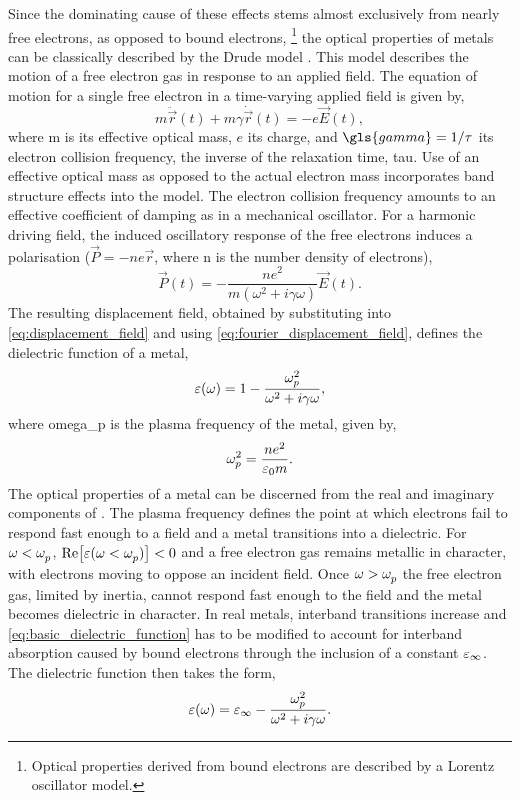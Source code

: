 \documentclass{article}
\begin{document}
Since the dominating cause of these effects stems almost exclusively from nearly free electrons, as opposed to bound electrons,%
\footnote{Optical properties derived from bound electrons are described by a Lorentz oscillator model.}
the optical properties of metals can be classically described by the Drude model \cite{drude1900}. This model describes the motion of a free electron gas in response to an applied field. The equation of motion for a single free electron in a time-varying applied field is given by,
\begin{equation}
	m\ddot{\vec{r}}(t) + m\gamma \dot{\vec{r}}(t) = -e\vec{E}(t),
\end{equation}
where \gls{m} is its effective optical mass, $e$ its charge, and $\gls{gamma} = 1/\tau$ its electron collision frequency, the inverse of the relaxation time, \gls{tau}. Use of an effective optical mass as opposed to the actual electron mass incorporates band structure effects into the model. The electron collision frequency amounts to an effective coefficient of damping as in a mechanical oscillator. For a harmonic driving field, the induced oscillatory response of the free electrons induces a polarisation ($\vec{P} = -ne\vec{r}$, where \gls{n} is the number density of electrons),
\begin{equation}
	\vec{P}(t) = -\frac{ne^2}{m(\omega^2 + i\gamma\omega)}\vec{E}(t).
	\label{eq:P_solution}
\end{equation}
The resulting displacement field, obtained by substituting  into \eqref{eq:displacement_field} and using \eqref{eq:fourier_displacement_field}, defines the dielectric function of a metal,
\begin{equation}
	\eps(\omega) = 1 - \frac{\omegap[2]}{\omega^2 + i\gamma\omega},
	\label{eq:basic_dielectric_function}
\end{equation}
where \gls{omega_p} is the plasma frequency of the metal, given by,
\begin{equation}
	\omegap[2] = \frac{ne^2}{\varepsilon_0 m}.
	\label{eq:plasma_frequency}
\end{equation}
The optical properties of a metal can be discerned from the real and imaginary components of \dielectric. The plasma frequency defines the point at which electrons fail to respond fast enough to a field and a metal transitions into a dielectric. For $\omega<\omega_{p}^{}$, $\mathrm{Re}\!\left[{\varepsilon(\omega<\omega_{p}^{})}\right] < 0$ and a free electron gas remains metallic in character, with electrons moving to oppose an incident field. Once $\omega > \omega_{p}^{}$ the free electron gas, limited by inertia, cannot respond fast enough to the field and the metal becomes dielectric in character. In real metals, interband transitions increase \imag{\dielectric} and \eqref{eq:basic_dielectric_function} has to be modified to account for interband absorption caused by bound electrons through the inclusion of a constant $\varepsilon_\infty$. The dielectric function then takes the form,
\begin{equation}
	\dielectric = \eps_\infty - \frac{\omegap[2]}{\omega^2 + i\gamma\omega}.
	\label{eq:dielectric_function}
\end{equation}
\end{document}
